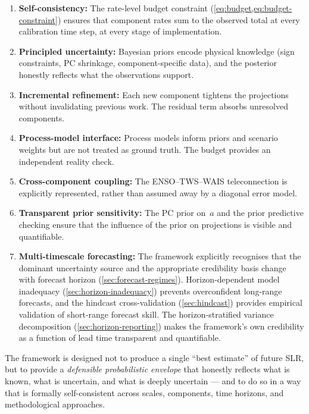 \documentclass[11pt]{article}
\begin{document}
\begin{enumerate}
  \item \textbf{Self-consistency:} The rate-level budget constraint (\cref{eq:budget,eq:budget-constraint}) ensures that component rates sum to the observed total at every calibration time step, at every stage of implementation.

  \item \textbf{Principled uncertainty:} Bayesian priors encode physical knowledge (sign constraints, PC shrinkage, component-specific data), and the posterior honestly reflects what the observations support.

  \item \textbf{Incremental refinement:} Each new component tightens the projections without invalidating previous work.  The residual term absorbs unresolved components.

  \item \textbf{Process-model interface:} Process models inform priors and scenario weights but are not treated as ground truth.  The budget provides an independent reality check.

  \item \textbf{Cross-component coupling:} The ENSO--TWS--WAIS teleconnection is explicitly represented, rather than assumed away by a diagonal error model.

  \item \textbf{Transparent prior sensitivity:} The PC prior on~$a$ and the prior predictive checking ensure that the influence of the prior on projections is visible and quantifiable.

  \item \textbf{Multi-timescale forecasting:} The framework explicitly recognises that the dominant uncertainty source and the appropriate credibility basis change with forecast horizon (\cref{sec:forecast-regimes}).  Horizon-dependent model inadequacy (\cref{sec:horizon-inadequacy}) prevents overconfident long-range forecasts, and the hindcast cross-validation (\cref{sec:hindcast}) provides empirical validation of short-range forecast skill.  The horizon-stratified variance decomposition (\cref{sec:horizon-reporting}) makes the framework's own credibility as a function of lead time transparent and quantifiable.
\end{enumerate}

The framework is designed not to produce a single ``best estimate'' of future SLR, but to provide a \emph{defensible probabilistic envelope} that honestly reflects what is known, what is uncertain, and what is deeply uncertain --- and to do so in a way that is formally self-consistent across scales, components, time horizons, and methodological approaches.



\end{document}

